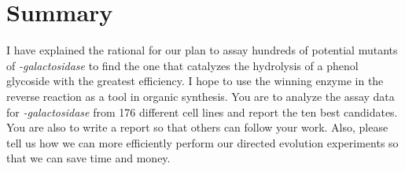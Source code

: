 \documentclass[]{tufte-handout}
\begin{document}
\section{Summary}

I have explained the rational for our plan to assay hundreds of potential mutants of \emph{\textbeta -galactosidase} to find the one that catalyzes the hydrolysis of a phenol glycoside with the greatest efficiency. I hope to use the winning enzyme in the reverse reaction as a tool in organic synthesis. You are to analyze the assay data for \emph{\textbeta -galactosidase} from 176 different cell lines and report the ten best candidates. You are also to write a report so that others can follow your work. Also, please tell us how we can more efficiently perform our directed evolution experiments so that we can save time and money.



\nobibliography{}
\end{document}

